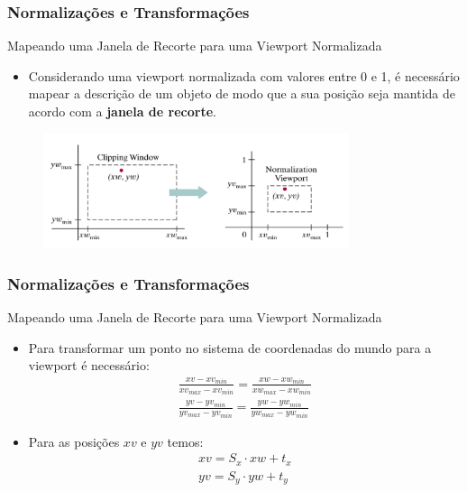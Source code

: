 \documentclass{beamer}
\begin{document}
\begin{frame}
\frametitle{Normalizações e Transformações }

	\begin{block}{Mapeando uma Janela de Recorte para uma Viewport Normalizada}
		\begin{itemize}
			\item Considerando uma viewport normalizada com valores entre 0 e 1, é necessário mapear a descrição de um objeto de modo que a sua posição seja mantida de acordo com a \textbf{janela de recorte}. 	 
		\end{itemize}	
	\end{block}
	
	\begin{figure}[!h]
			\begin{center}
				\includegraphics[width=0.8\textwidth]{Figures/VieNor}
			\end{center}
	\end{figure}	
\end{frame}

\begin{frame}
\frametitle{Normalizações e Transformações }

	\begin{block}{Mapeando uma Janela de Recorte para uma Viewport Normalizada}
		\begin{itemize}
			\item Para transformar um ponto no sistema de coordenadas do mundo para a viewport é necessário:
			\begin{eqnarray*}
				\frac{xv-xv_{min}}{xv_{max}-xv_{min}} = \frac{xw-xw_{min}}{xw_{max}-xw_{min}}\\
				\frac{yv-yv_{min}}{yv_{max}-yv_{min}} = \frac{yw-yw_{min}}{yw_{max}-yw_{min}}
			\end{eqnarray*}	
			
		\item Para as posições $xv$ e $yv$ temos:
			\begin{eqnarray*}
				xv = S_x \cdot xw + t_x \\
				yv = S_y \cdot yw + t_y
			\end{eqnarray*}					 	 
		\end{itemize}	
	\end{block}
	
\end{frame}
\end{document}
